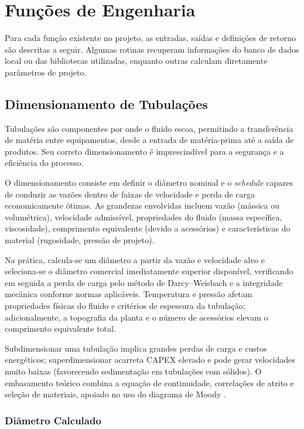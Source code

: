\section{Funções de Engenharia}

Para cada função existente no projeto, as entradas, saídas e definições de retorno são descritas a seguir. Algumas rotinas recuperam informações do banco de dados local ou das bibliotecas utilizadas, enquanto outras calculam diretamente parâmetros de projeto.

\subsection{Dimensionamento de Tubulações}

Tubulações são componentes por onde o fluido escoa, permitindo a transferência de matéria entre equipamentos, desde a entrada de matéria-prima até a saída de produtos. Seu correto dimensionamento é imprescindível para a segurança e a eficiência do processo.

O dimensionamento consiste em definir o diâmetro nominal e o \textit{schedule} capazes de conduzir as vazões dentro de faixas de velocidade e perda de carga economicamente ótimas. As grandezas envolvidas incluem vazão (mássica ou volumétrica), velocidade admissível, propriedades do fluido (massa específica, viscosidade), comprimento equivalente (devido a acessórios) e características do material (rugosidade, pressão de projeto).

Na prática, calcula-se um diâmetro a partir da vazão e velocidade alvo e seleciona-se o diâmetro comercial imediatamente superior disponível, verificando em seguida a perda de carga pelo método de Darcy–Weisbach e a integridade mecânica conforme normas aplicáveis. Temperatura e pressão afetam propriedades físicas do fluido e critérios de espessura da tubulação; adicionalmente, a topografia da planta e o número de acessórios elevam o comprimento equivalente total.

Subdimensionar uma tubulação implica grandes perdas de carga e custos energéticos; superdimensionar acarreta CAPEX elevado e pode gerar velocidades muito baixas (favorecendo sedimentação em tubulações com sólidos). O embasamento teórico combina a equação de continuidade, correlações de atrito e seleção de materiais, apoiado no uso do diagrama de Moody \cite{white2018}.

\subsubsection{Diâmetro Calculado}

